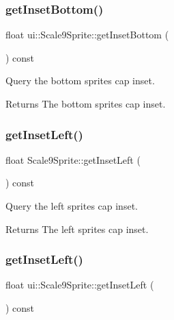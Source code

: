 \subsubsection{\texorpdfstring{get\+Inset\+Bottom()}{getInsetBottom()}\hspace{0.1cm}{\footnotesize\ttfamily [2/2]}}
{\footnotesize\ttfamily float ui\+::\+Scale9\+Sprite\+::get\+Inset\+Bottom (\begin{DoxyParamCaption}{ }\end{DoxyParamCaption}) const}



Query the bottom sprite\textquotesingle{}s cap inset. 

\begin{DoxyReturn}{Returns}
The bottom sprite\textquotesingle{}s cap inset. 
\end{DoxyReturn}
\mbox{\label{classui_1_1Scale9Sprite_a580d1f1c795a4c6fbb1432dd2af34f55}} 
\subsubsection{\texorpdfstring{get\+Inset\+Left()}{getInsetLeft()}\hspace{0.1cm}{\footnotesize\ttfamily [1/2]}}
{\footnotesize\ttfamily float Scale9\+Sprite\+::get\+Inset\+Left (\begin{DoxyParamCaption}{ }\end{DoxyParamCaption}) const}



Query the left sprite\textquotesingle{}s cap inset. 

\begin{DoxyReturn}{Returns}
The left sprite\textquotesingle{}s cap inset. 
\end{DoxyReturn}
\mbox{\label{classui_1_1Scale9Sprite_ab59329e213341b7c0a733414519e66ed}} 
\subsubsection{\texorpdfstring{get\+Inset\+Left()}{getInsetLeft()}\hspace{0.1cm}{\footnotesize\ttfamily [2/2]}}
{\footnotesize\ttfamily float ui\+::\+Scale9\+Sprite\+::get\+Inset\+Left (\begin{DoxyParamCaption}{ }\end{DoxyParamCaption}) const}



